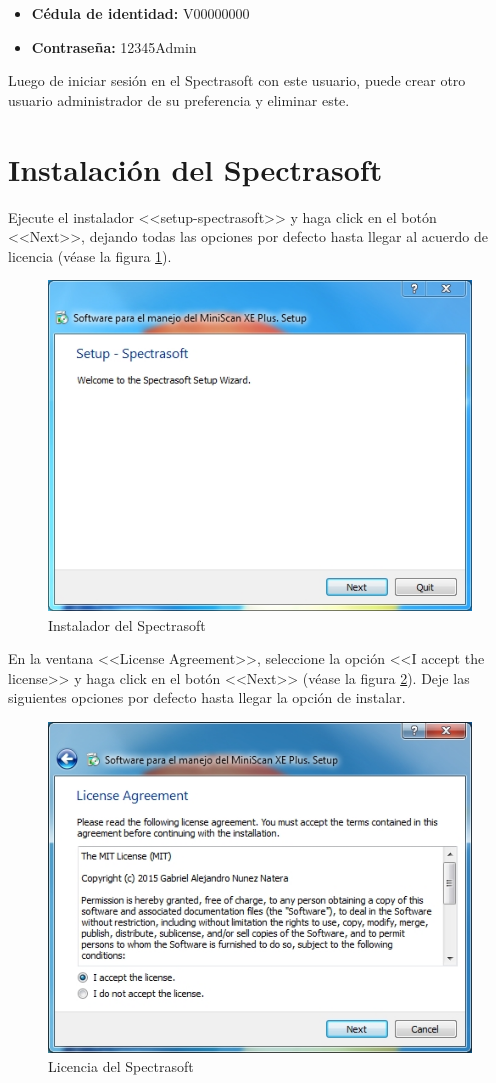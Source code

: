 \begin{itemize}
	\item \textbf{C\'{e}dula de identidad:} V00000000
	
	\item \textbf{Contrase\~{n}a:} 12345Admin
\end{itemize}

Luego de iniciar sesi\'{o}n en el Spectrasoft con este usuario, puede crear otro usuario administrador de su preferencia y eliminar este.

\section*{Instalaci\'{o}n del Spectrasoft}

Ejecute el instalador <<setup-spectrasoft>> y haga click en el bot\'{o}n <<Next>>, dejando todas las opciones por defecto hasta llegar al acuerdo de licencia (v\'{e}ase la figura \ref{fig:spectrasoft-setup}).

\begin{figure}[H]
  \centering
  \includegraphics[width=.5\linewidth]{./img/spectrasoft-setup.jpg}
\caption[]{Instalador del Spectrasoft\label{fig:spectrasoft-setup}}
\end{figure}

En la ventana <<License Agreement>>, seleccione la opci\'{o}n <<I accept the license>> y haga click en el bot\'{o}n <<Next>> (v\'{e}ase la figura \ref{fig:spectrasoft-licencia}). Deje las siguientes opciones por defecto hasta llegar la opci\'{o}n de instalar.

\begin{figure}[H]
  \centering
  \includegraphics[width=.5\linewidth]{./img/spectrasoft-licencia.jpg}
\caption[]{Licencia del Spectrasoft\label{fig:spectrasoft-licencia}}
\end{figure}

